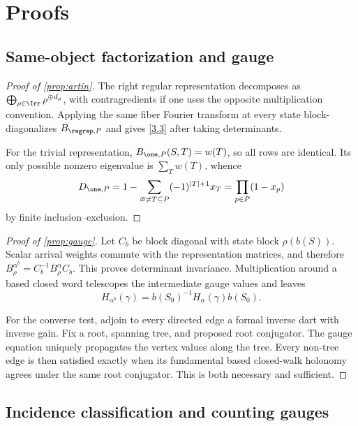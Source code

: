 \section{Proofs}
\label{app:proofs}

\subsection{Same-object factorization and gauge}
\label{app:artin-proof}

\begin{proof}[Proof of \cref{prop:artin}]
The right regular representation decomposes as
$\bigoplus_{\rho\in\Irr}\rho^{\oplus d_\rho}$, with contragredients if one
uses the opposite multiplication convention.  Applying the same fiber
Fourier transform at every state block-diagonalizes $B_{\regrep,P}$ and
gives \eqref{3.3} after taking determinants.

For the trivial representation, $B_{\one,P}(S,T)=w(T)$, so all rows are
identical.  Its only possible nonzero eigenvalue is $\sum_Tw(T)$, whence
\[
D_{\one,P}=1-\sum_{\varnothing\ne T\subseteq P}
(-1)^{|T|+1}x_T=\prod_{p\in P}(1-x_p)
\]
by finite inclusion--exclusion.
\end{proof}

\begin{proof}[Proof of \cref{prop:gauge}]
Let $C_b$ be block diagonal with state block $\rho(b(S))$.  Scalar arrival
weights commute with the representation matrices, and therefore
$B_\rho^{\alpha^b}=C_b^{-1}B_\rho^\alpha C_b$.  This proves determinant
invariance.  Multiplication around a based closed word telescopes the
intermediate gauge values and leaves
\[
H_{\alpha^b}(\gamma)=b(S_0)^{-1}H_\alpha(\gamma)b(S_0).
\]

For the converse test, adjoin to every directed edge a formal inverse dart
with inverse gain.  Fix a root, spanning tree, and proposed root conjugator.
The gauge equation uniquely propagates the vertex values along the tree.
Every non-tree edge is then satisfied exactly when its fundamental based
closed-walk holonomy agrees under the same root conjugator.  This is both
necessary and sufficient.
\end{proof}

\subsection{Incidence classification and counting gauges}

